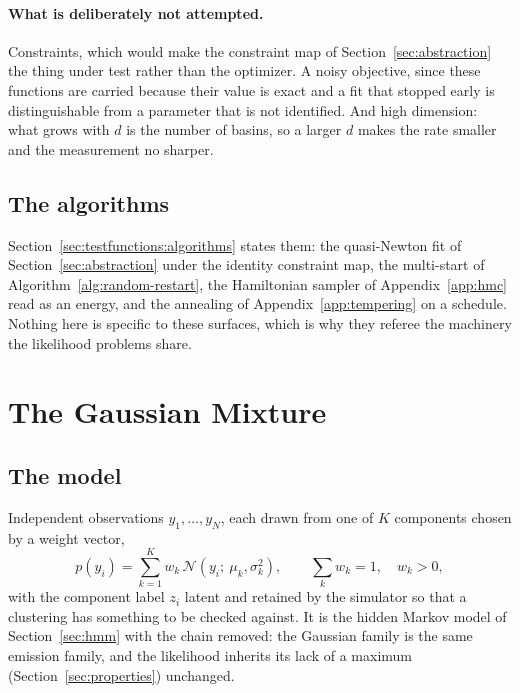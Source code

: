 \documentclass[11pt,a4paper]{article}
\begin{document}
\paragraph{What is deliberately not attempted.}
Constraints, which would make the constraint map of
Section~\ref{sec:abstraction} the thing under test rather than the optimizer. A
noisy objective, since these functions are carried because their value is exact
and a fit that stopped early is distinguishable from a parameter that is not
identified. And high dimension: what grows with $d$ is the number of basins, so
a larger $d$ makes the rate smaller and the measurement no sharper.

\subsection{The algorithms}
Section~\ref{sec:testfunctions:algorithms} states them: the
quasi-Newton fit of Section~\ref{sec:abstraction} under the identity
constraint map, the multi-start of Algorithm~\ref{alg:random-restart}, the
Hamiltonian sampler of Appendix~\ref{app:hmc} read as an energy, and the
annealing of Appendix~\ref{app:tempering} on a schedule. Nothing here is
specific to these surfaces, which is why they referee the machinery the
likelihood problems share.

\section{The Gaussian Mixture}
\label{sec:mixture}

\subsection{The model}
\label{sec:mixture:model}
Independent observations $y_1, \dots, y_N$, each drawn from one of $K$
components chosen by a weight vector,
\begin{equation}
  p(y_i) = \sum_{k=1}^{K} w_k\, \mathcal{N}(y_i;\ \mu_k, \sigma_k^2),
  \qquad
  \sum_k w_k = 1,\quad w_k > 0 ,
  \label{eq:mixture}
\end{equation}
with the component label $z_i$ latent and retained by the simulator so that
a clustering has something to be checked against. It is the hidden Markov
model of Section~\ref{sec:hmm} with the chain removed: the Gaussian family is
the same emission family, and the likelihood inherits its lack of a maximum
(Section~\ref{sec:properties}) unchanged.
\end{document}
